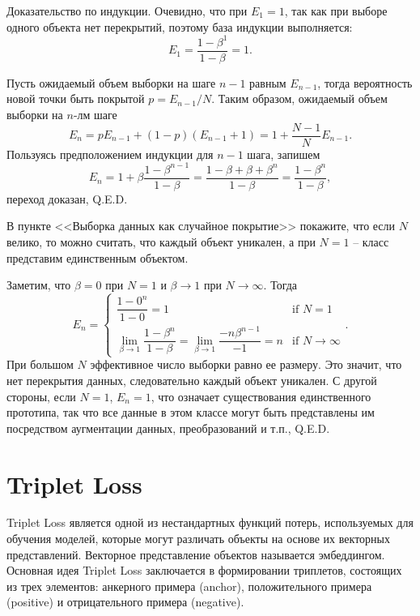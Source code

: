 \begin{solution}
    Доказательство по индукции. Очевидно, что при $E_1=1$, так как при выборе одного объекта нет перекрытий, поэтому база индукции выполняется:
    \[
        E_1=\dfrac{1-\beta^1}{1-\beta}=1.
    \]

    Пусть ожидаемый объем выборки на шаге $n-1$ равным $E_{n-1}$, тогда вероятность новой точки быть покрытой $p=E_{n-1}/N$. Таким образом, ожидаемый объем выборки на $n$-лм шаге
    \[
        E_n=pE_{n-1}+(1-p)(E_{n-1}+1)=1+\dfrac{N-1}{N}E_{n-1}.
    \]
    Пользуясь предположением индукции для $n-1$ шага, запишем
    \[
        E_n=1+\beta\dfrac{1-\beta^{n-1}}{1-\beta}=\dfrac{1-\beta+\beta+\beta^{n}}{1-\beta}=\dfrac{1-\beta^{n}}{1-\beta},
    \]
    переход доказан, Q.E.D.
\end{solution}

\begin{problem}
В пункте <<Выборка данных как случайное покрытие>>  покажите, что если $N$ велико, то можно считать, что каждый объект уникален, а при $N=1$ -- класс представим единственным объектом.
\end{problem}

\begin{solution}
    Заметим, что $\beta=0$ при $N=1$ и $\beta \to 1$ при $N \to \infty$. Тогда
    \[
        E_n=\begin{cases}
            \dfrac{1-0^n}{1-0}=1                                                                                     & \text{if } N=1          \\
            \lim\limits_{\beta \to 1}\dfrac{1-\beta^n}{1-\beta}=\lim\limits_{\beta \to 1}\dfrac{-n\beta^{n-1}}{-1}=n & \text{if } N \to \infty
        \end{cases}.
    \]
    При большом $N$ эффективное число выборки равно ее размеру. Это значит, что нет перекрытия данных, следовательно каждый объект уникален. С другой стороны, если $N=1$, $E_n=1$, что означает существования единственного прототипа, так что все данные в этом классе могут быть представлены им посредством аугментации данных, преобразований и т.п., Q.E.D.
\end{solution}


\section*{Triplet Loss}

Triplet Loss является одной из нестандартных функций потерь, используемых для обучения моделей, которые могут различать объекты на основе их векторных представлений. Векторное представление объектов называется эмбеддингом. Основная идея Triplet Loss заключается в формировании триплетов, состоящих из трех элементов: анкерного примера (anchor), положительного примера (positive) и отрицательного примера (negative).


